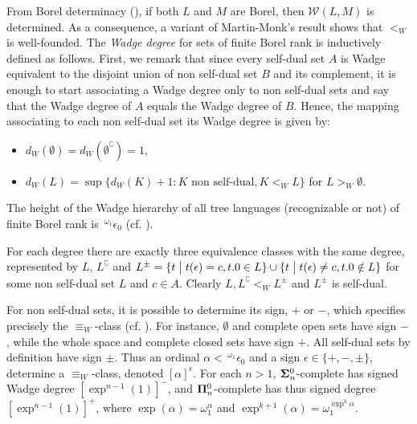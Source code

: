 From Borel determinacy (\cite{martin}),
if both $L$ and $M$ are Borel, then $\mathcal{W}(L, M)$ is determined.
As a consequence, a variant of Martin-Monk's result shows that $<_W$ is
well-founded. The \emph{Wadge degree} for sets of finite Borel rank is
inductively defined as follows. First, we remark that since every self-dual set $A$ is Wadge equivalent to the disjoint union of non self-dual set $B$ and its complement, it is enough to start associating a Wadge degree only to non self-dual sets and say that the Wadge degree of $A$ equals the Wadge degree of $B$. Hence, the mapping associating to each non self-dual set its Wadge degree is given by:
\begin{itemize}
\item $d_W(\emptyset)=d_W(\emptyset^\complement)=1$,
\item $d_W(L)=\sup\{d_W(K)+1\colon K \text{ non self-dual}, K <_WL\}$ for $L>_W\emptyset$.
\end{itemize}
The
height of the Wadge hierarchy of all tree languages (recognizable or
not) of finite Borel rank is $\,{}^{\omega_1} \epsilon_0$ (cf. \cite{dup1}).

For each degree there are exactly three equivalence
classes with the same degree, represented by $L$, $L^\complement$ and
$L^\pm = \{t \bigm | t(\epsilon) = c, t.0\in L \} \cup  \{t \bigm |
t(\epsilon) \neq c, t.0\notin L \}$ for some non self-dual set $L$ and
$c\in A$. Clearly $L, L^\complement <_W L^\pm$ and
$L^\pm$ is self-dual.

For non self-dual sets, it is possible to determine its sign, $+$
or $-$, which specifies precisely the $\equiv_W$-class
(cf. \cite{dup1}). 
For instance, $\emptyset$ and complete open sets have sign $-$, while the whole space and complete closed  sets have sign $+$.
  All self-dual sets by
definition have sign $\pm$. Thus an ordinal $\alpha <\,
{}^{\omega_1}\epsilon_0$ and a sign $\epsilon \in \{+,-,\pm\}$,
determine a $\equiv_W$-class, denoted  $[\alpha]^\epsilon$. For each $n>1$, ${\bf \Sigma}^0_n$-complete has signed Wadge degree $[\exp^{n-1}(1)]^-$, and  ${\bf \Pi}^0_n$-complete has thus signed degree $[\exp^{n-1}(1)]^+$, where $\exp(\alpha) = \omega_1^\alpha$ and $\exp^{k+1}(\alpha) = \omega_1^{\exp^k{\alpha}}$.

